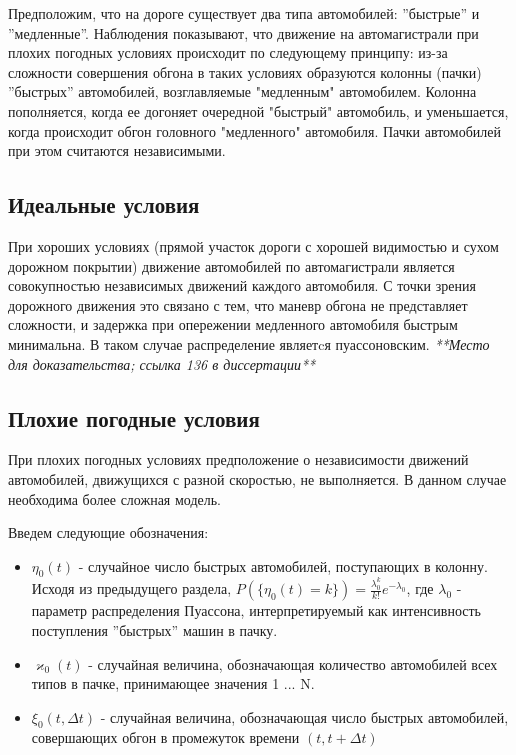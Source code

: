 \documentclass[a4paper, 14pt, russian]{article}
\begin{document}
Предположим, что на дороге существует два типа автомобилей: ''быстрые'' и ''медленные''. Наблюдения показывают, что движение на автомагистрали при плохих погодных условиях происходит по следующему принципу: из-за сложности совершения обгона в таких условиях образуются колонны (пачки) ''быстрых'' автомобилей, возглавляемые "медленным" автомобилем. Колонна пополняется, когда ее догоняет очередной "быстрый" автомобиль, и уменьшается, когда происходит обгон головного "медленного" автомобиля. Пачки автомобилей при этом считаются независимыми.

\subsection{Идеальные условия}
При хороших условиях (прямой участок дороги с хорошей видимостью и сухом дорожном покрытии) движение автомобилей по автомагистрали является совокупностью независимых движений каждого автомобиля. С точки зрения дорожного движения это связано с тем, что маневр обгона не представляет сложности, и задержка при опережении медленного автомобиля быстрым минимальна. В таком случае распределение являетcя пуассоновским.
\textit{**Место для доказательства; ссылка 136 в диссертации**}

\subsection{Плохие погодные условия}
При плохих погодных условиях предположение о независимости движений автомобилей, движущихся с разной скоростью, не выполняется. В данном случае необходима более сложная модель.

Введем следующие обозначения:
\begin{itemize}

\item $\eta_0(t)$ - случайное число быстрых автомобилей, поступающих в колонну. Исходя из предыдущего раздела,
$P(\{\eta_0(t) = k\}) = \frac{\lambda_0^k}{k!}e^{- \lambda_0}$,
где $\lambda_0$ - параметр распределения Пуассона, интерпретируемый как интенсивность поступления ''быстрых'' машин в пачку.

\item $\varkappa_0(t)$ - случайная величина, обозначающая количество автомобилей всех типов в пачке, принимающее значения {1 ... N}.

\item $\xi_0(t, \Delta t)$ - случайная величина, обозначающая число быстрых автомобилей, совершающих обгон в промежуток времени $(t, t + \Delta t)$
\end{itemize}
\end{document}
